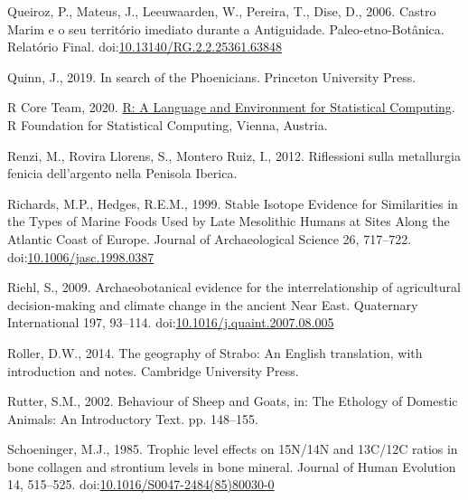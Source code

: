 \documentclass[review]{elsarticle} %
\newlength{\cslhangindent}
\newenvironment{CSLReferences}[2] %
 {%
  \setlength{\parindent}{0pt}
  \ifodd #1 \everypar{\setlength{\hangindent}{\cslhangindent}}\ignorespaces\fi
  \ifnum #2 > 0
  \setlength{\parskip}{#2\baselineskip}
  \fi
 }%
 {}
\begin{document}
\begin{CSLReferences}{1}{0}
\leavevmode{}%
Queiroz, P., Mateus, J., Leeuwaarden, W., Pereira, T., Dise, D., 2006. Castro {Marim} e o seu território imediato durante a {Antiguidade}. {Paleo}-etno-{Botânica}. {Relatório Final}. doi:\href{https://doi.org/10.13140/RG.2.2.25361.63848}{10.13140/RG.2.2.25361.63848}

\leavevmode{}%
Quinn, J., 2019. In search of the {Phoenicians}. {Princeton University Press}.

\leavevmode{}%
R Core Team, 2020. \href{https://www.R-project.org/}{R: {A Language} and {Environment} for {Statistical Computing}}. {R Foundation for Statistical Computing}, {Vienna, Austria}.

\leavevmode{}%
Renzi, M., Rovira Llorens, S., Montero Ruiz, I., 2012. Riflessioni sulla metallurgia fenicia dell'argento nella {Penisola Iberica}.

\leavevmode{}%
Richards, M.P., Hedges, R.E.M., 1999. Stable {Isotope Evidence} for {Similarities} in the {Types} of {Marine Foods Used} by {Late Mesolithic Humans} at {Sites Along} the {Atlantic Coast} of {Europe}. Journal of Archaeological Science 26, 717--722. doi:\href{https://doi.org/10.1006/jasc.1998.0387}{10.1006/jasc.1998.0387}

\leavevmode{}%
Riehl, S., 2009. Archaeobotanical evidence for the interrelationship of agricultural decision-making and climate change in the ancient {Near East}. Quaternary International 197, 93--114. doi:\href{https://doi.org/10.1016/j.quaint.2007.08.005}{10.1016/j.quaint.2007.08.005}

\leavevmode{}%
Roller, D.W., 2014. The geography of {Strabo}: {An English} translation, with introduction and notes. {Cambridge University Press}.

\leavevmode{}%
Rutter, S.M., 2002. Behaviour of {Sheep} and {Goats}, in: The Ethology of Domestic Animals: {An} Introductory Text. pp. 148--155.

\leavevmode{}%
Schoeninger, M.J., 1985. Trophic level effects on {15N}/{14N} and {13C}/{12C} ratios in bone collagen and strontium levels in bone mineral. Journal of Human Evolution 14, 515--525. doi:\href{https://doi.org/10.1016/S0047-2484(85)80030-0}{10.1016/S0047-2484(85)80030-0}


\end{CSLReferences}
\end{document}
